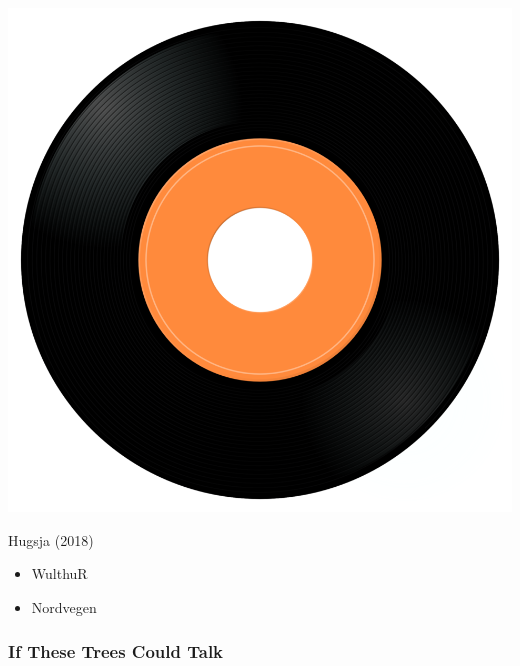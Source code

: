 \begin{minipage}[t]{0.25\textwidth}\vspace{0pt}
\captionsetup{type=figure}
\includegraphics[width=\textwidth]{Images/cover.png}
\caption*{Hugsja (2018)}
\end{minipage}
\begin{minipage}[t]{0.25\textwidth}\vspace{0pt}
\begin{itemize}[nosep,leftmargin=1em,labelwidth=*,align=left]
	\setlength{\itemsep}{0pt}
	\item WulthuR
	\item Nordvegen
\end{itemize}
\end{minipage}

\subsubsection{If These Trees Could Talk}

